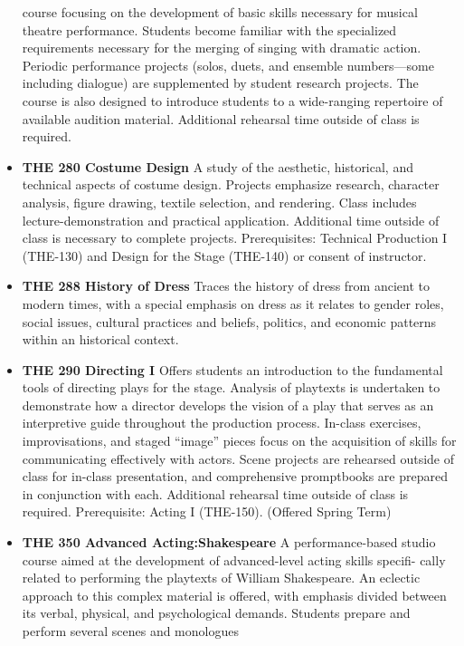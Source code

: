 \documentclass[
  letterpaper,
]{scrbook}
\begin{document}
\begin{itemize}
  course focusing on the development of basic skills necessary for
  musical theatre performance. Students become familiar with the
  specialized requirements necessary for the merging of singing with
  dramatic action. Periodic performance projects (solos, duets, and
  ensemble numbers---some including dialogue) are supplemented by
  student research projects. The course is also designed to introduce
  students to a wide-ranging repertoire of available audition material.
  Additional rehearsal time outside of class is required.
\item
  \textbf{THE 280 Costume Design} A study of the aesthetic, historical,
  and technical aspects of costume design. Projects emphasize research,
  character analysis, figure drawing, textile selection, and rendering.
  Class includes lecture-demonstration and practical application.
  Additional time outside of class is necessary to complete projects.
  Prerequisites: Technical Production I (THE-130) and Design for the
  Stage (THE-140) or consent of instructor.\\
\item
  \textbf{THE 288 History of Dress} Traces the history of dress from
  ancient to modern times, with a special emphasis on dress as it
  relates to gender roles, social issues, cultural practices and
  beliefs, politics, and economic patterns within an historical context.
\item
  \textbf{THE 290 Directing I} Offers students an introduction to the
  fundamental tools of directing plays for the stage. Analysis of
  playtexts is undertaken to demonstrate how a director develops the
  vision of a play that serves as an interpretive guide throughout the
  production process. In-class exercises, improvisations, and staged
  ``image'' pieces focus on the acquisition of skills for communicating
  effectively with actors. Scene projects are rehearsed outside of class
  for in-class presentation, and comprehensive promptbooks are prepared
  in conjunction with each. Additional rehearsal time outside of class
  is required. Prerequisite: Acting I (THE-150). (Offered Spring Term)\\
\item
  \textbf{THE 350 Advanced Acting:Shakespeare} A performance-based
  studio course aimed at the development of advanced-level acting skills
  specifi- cally related to performing the playtexts of William
  Shakespeare. An eclectic approach to this complex material is offered,
  with emphasis divided between its verbal, physical, and psychological
  demands. Students prepare and perform several scenes and monologues

\end{itemize}
\end{document}
